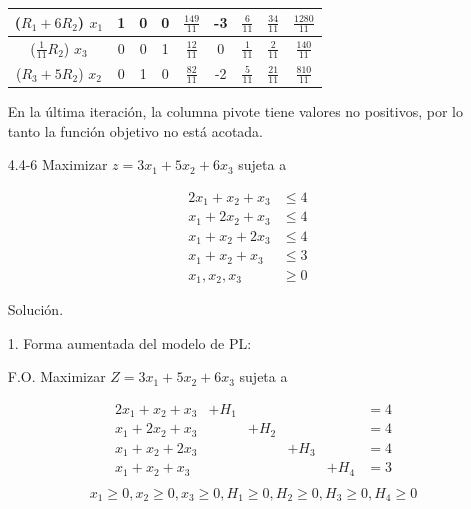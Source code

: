 \documentclass[fleqn, 12pt]{article}
\begin{document}
\begin{enumerate}
\begin{center}
\begin{tabular}{|c|c|c|c|c|c|c|c|c|}
				\hline
				($R_1 + 6 R_2$) $ x_1 $ & 1        & 0        & 0         & $\frac{149}{11}$ & \cellcolor{yellow} -3      & $\frac{6}{11}$  & $\frac{34}{11}$ & $\frac{1280}{11}$ \\
				\hline
				($\frac{1}{11} R_2$) $ x_3 $                 & 0        & 0        & 1		 & $\frac{12}{11}$ & \cellcolor{yellow} 0       & $\frac{1}{11}$  & $\frac{2}{11}$  & $\frac{140}{11}$ \\
				\hline
				($R_3 + 5 R_2$) $ x_2 $ & 0        & 1        & 0         & $\frac{82}{11}$ & \cellcolor{yellow} -2      & $\frac{5}{11}$  & $\frac{21}{11}$ & $\frac{810}{11}$ \\
				\hline
			\end{tabular}
		\end{center}

		En la última iteración, la columna pivote tiene valores no positivos, por lo tanto la función objetivo no está acotada.

		\item[4.4-6] Maximizar $ z = 3 x_1 + 5 x_2 + 6 x_3 $ sujeta a
		
		\begin{align*}
			2 x_1 + x_2 + x_3 & \leq 4 \\
			x_1 + 2 x_2 + x_3 & \leq 4 \\
			x_1 + x_2 + 2 x_3 & \leq 4 \\
			x_1 + x_2 + x_3 & \leq 3 \\
			x_1, x_2, x_3 & \geq 0
		\end{align*}

		Solución.

		1. Forma aumentada del modelo de PL:

		F.O. Maximizar $ Z = 3 x_1 + 5 x_2 + 6 x_3 $ sujeta a

		\begin{align*}
			& 2 x_1 + x_2 + x_3 & + H_1 &       &       &       & = 4 \\
			& x_1 + 2 x_2 + x_3 &       & + H_2 &       &       & = 4 \\
			& x_1 + x_2 + 2 x_3 &       &       & + H_3 &       & = 4 \\
			& x_1 + x_2 + x_3   &       &       &       & + H_4 & = 3 \\
		\end{align*}
		\begin{align*}
			& x_1 \geq 0, x_2 \geq 0, x_3 \geq 0, H_1 \geq 0, H_2 \geq 0, H_3 \geq 0, H_4 \geq 0
		\end{align*}


\end{enumerate}
\end{document}
